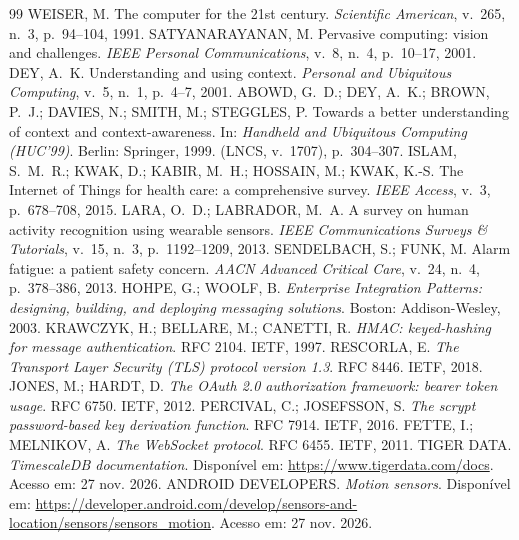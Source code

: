\documentclass[12pt,a4paper]{article}
\begin{document}
\begin{thebibliography}{99}\small
{} WEISER, M. The computer for the 21st century. \emph{Scientific American}, v.~265, n.~3, p.~94--104, 1991.
 SATYANARAYANAN, M. Pervasive computing: vision and challenges. \emph{IEEE Personal Communications}, v.~8, n.~4, p.~10--17, 2001.
 DEY, A.~K. Understanding and using context. \emph{Personal and Ubiquitous Computing}, v.~5, n.~1, p.~4--7, 2001.
 ABOWD, G.~D.; DEY, A.~K.; BROWN, P.~J.; DAVIES, N.; SMITH, M.; STEGGLES, P. Towards a better understanding of context and context-awareness. In: \emph{Handheld and Ubiquitous Computing (HUC'99)}. Berlin: Springer, 1999. (LNCS, v.~1707), p.~304--307.
 ISLAM, S.~M.~R.; KWAK, D.; KABIR, M.~H.; HOSSAIN, M.; KWAK, K.-S. The Internet of Things for health care: a comprehensive survey. \emph{IEEE Access}, v.~3, p.~678--708, 2015.
 LARA, O.~D.; LABRADOR, M.~A. A survey on human activity recognition using wearable sensors. \emph{IEEE Communications Surveys \& Tutorials}, v.~15, n.~3, p.~1192--1209, 2013.
 SENDELBACH, S.; FUNK, M. Alarm fatigue: a patient safety concern. \emph{AACN Advanced Critical Care}, v.~24, n.~4, p.~378--386, 2013.
 HOHPE, G.; WOOLF, B. \emph{Enterprise Integration Patterns: designing, building, and deploying messaging solutions}. Boston: Addison-Wesley, 2003.
 KRAWCZYK, H.; BELLARE, M.; CANETTI, R. \emph{HMAC: keyed-hashing for message authentication}. RFC 2104. IETF, 1997.
 RESCORLA, E. \emph{The Transport Layer Security (TLS) protocol version 1.3}. RFC 8446. IETF, 2018.
 JONES, M.; HARDT, D. \emph{The OAuth 2.0 authorization framework: bearer token usage}. RFC 6750. IETF, 2012.
 PERCIVAL, C.; JOSEFSSON, S. \emph{The scrypt password-based key derivation function}. RFC 7914. IETF, 2016.
 FETTE, I.; MELNIKOV, A. \emph{The WebSocket protocol}. RFC 6455. IETF, 2011.
 TIGER DATA. \emph{TimescaleDB documentation}. Disponível em: \url{https://www.tigerdata.com/docs}. Acesso em: 27 nov. 2026.
 ANDROID DEVELOPERS. \emph{Motion sensors}. Disponível em: \url{https://developer.android.com/develop/sensors-and-location/sensors/sensors_motion}. Acesso em: 27 nov. 2026.
\end{thebibliography}
\end{document}

